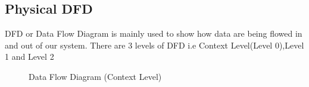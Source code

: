 \subsection{Physical DFD}
DFD or Data Flow Diagram is mainly used to show how data are being flowed in and out of our system. There are 3 levels of DFD i.e Context Level(Level 0),Level 1 and Level 2
\begin{figure}[H]
    \centering
    \caption{Data Flow Diagram (Context Level)}
\end{figure}
\newpage
